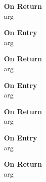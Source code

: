 \begin{description}
\item[\bf On Return]
\item[arg] 
\end{description}



%
%


\begin{description}
\item[\bf On Entry]
\item[arg]
\end{description}

\begin{description}
\item[\bf On Return]
\item[arg] 
\end{description}



%
%


\begin{description}
\item[\bf On Entry]
\item[arg]
\end{description}

\begin{description}
\item[\bf On Return]
\item[arg] 
\end{description}



%
%


\begin{description}
\item[\bf On Entry]
\item[arg]
\end{description}

\begin{description}
\item[\bf On Return]
\item[arg] 
\end{description}


